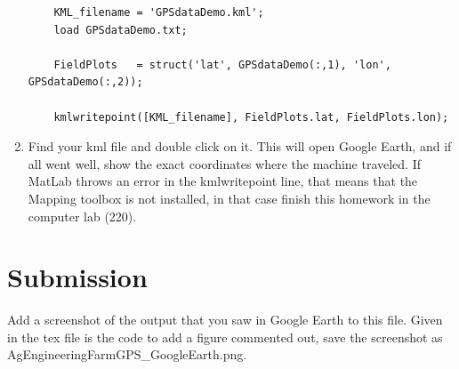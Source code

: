 \documentclass[12pt,letterpaper]{article}
\begin{document}
\begin{enumerate}
\begin{lstlisting}
	KML_filename = 'GPSdataDemo.kml';
	load GPSdataDemo.txt;
	
	FieldPlots   = struct('lat', GPSdataDemo(:,1), 'lon', GPSdataDemo(:,2));
	
	kmlwritepoint([KML_filename], FieldPlots.lat, FieldPlots.lon);
	\end{lstlisting}
	
	\item Find your kml file and double click on it. This will open Google Earth, and if all went well, show the exact coordinates where the machine traveled. If MatLab throws an error in the kmlwritepoint line, that means that the Mapping toolbox is not installed, in that case finish this homework in the computer lab (220).

\end{enumerate}

\section{Submission}

Add a screenshot of the output that you saw in Google Earth to this file. Given in the tex file is the code to add a figure commented out, save the screenshot as AgEngineeringFarmGPS\_GoogleEarth.png.

\end{document}
